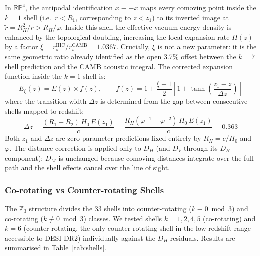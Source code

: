 \documentclass[12pt,a4paper]{article}
\begin{document}
In $\mathbb{RP}^4$, the antipodal identification $x \equiv -x$ maps every comoving
point inside the $k=1$ shell (i.e.\ $r < R_1$, corresponding to $z < z_1$) to its
inverted image at $\tilde{r} = R_H^2/r > R_H/\varphi$. Inside this shell the
effective vacuum energy density is enhanced by the topological doubling, increasing
the local expansion rate $H(z)$ by a factor $\xi = r_s^\mathrm{IHC}/r_s^\mathrm{CAMB}
= 1.0367$. Crucially, $\xi$ is not a new parameter: it is the same geometric ratio
already identified as the open 3.7\% offset between the $k=7$ shell prediction and
the CAMB acoustic integral. The corrected expansion function inside the $k=1$ shell is:
\begin{equation}
  E_\xi(z) = E(z) \times f(z), \qquad
  f(z) = 1 + \frac{\xi-1}{2}\left[1 + \tanh\!\left(\frac{z_1 - z}{\Delta z}\right)\right]
\end{equation}
where the transition width $\Delta z$ is determined from the gap between consecutive
shells mapped to redshift:
\begin{equation}
  \Delta z = \frac{(R_1 - R_2)\,H_0\,E(z_1)}{c}
  = \frac{R_H(\varphi^{-1}-\varphi^{-2})\,H_0\,E(z_1)}{c} = 0.363
\end{equation}
Both $z_1$ and $\Delta z$ are zero-parameter predictions fixed entirely by
$R_H = c/H_0$ and $\varphi$. The distance correction is applied only to $D_H$
(and $D_V$ through its $D_H$ component); $D_M$ is unchanged because comoving
distances integrate over the full path and the shell effects cancel over the line
of sight.

\subsubsection{Co-rotating vs Counter-rotating Shells}

The $\mathbb{Z}_3$ structure divides the 33 shells into counter-rotating
($k \equiv 0 \bmod 3$) and co-rotating ($k \not\equiv 0 \bmod 3$) classes. We tested
shells $k = 1, 2, 4, 5$ (co-rotating) and $k = 6$ (counter-rotating, the only
counter-rotating shell in the low-redshift range accessible to DESI DR2) individually
against the $D_H$ residuals. Results are summarised in Table~\ref{tab:shells}.
\end{document}
